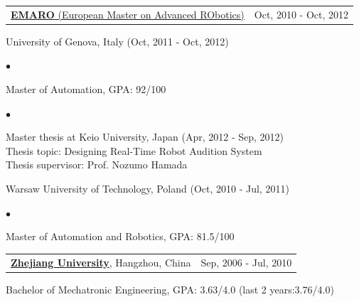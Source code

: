 \documentclass[margin,line]{res}
\newenvironment{list1}{
  \begin{list}{\ding{113}}{%
      \setlength{\itemsep}{0in}
      \setlength{\parsep}{0in} \setlength{\parskip}{0in}
      \setlength{\topsep}{0in} \setlength{\partopsep}{0in} 
      \setlength{\leftmargin}{0.17in}}}{\end{list}}
\newenvironment{list2}{
  \begin{list}{$\bullet$}{%
      \setlength{\itemsep}{0in}
      \setlength{\parsep}{0in} \setlength{\parskip}{0in}
      \setlength{\topsep}{0in} \setlength{\partopsep}{0in} 
      \setlength{\leftmargin}{0.2in}}}{\end{list}}
\begin{document}
\begin{resume}
\begin{tabularx}{\textwidth}{X r}
\href{http://emaro.irccyn.ec-nantes.fr/}{{\bf EMARO} (European Master on Advanced RObotics)} &Oct, 2010 - Oct, 2012\\
\end{tabularx}
\vspace*{-.1in}
\begin{list1}
\item[] University of Genova, Italy (Oct, 2011 - Oct, 2012)
\begin{list2}
\vspace*{.05in}
\item Master of Automation, GPA: 92/100
\end{list2}
\begin{list2}
\vspace*{.05in}
\item Master thesis at Keio University, Japan (Apr, 2012 - Sep, 2012)\\
Thesis topic: Designing Real-Time Robot Audition System\\
Thesis supervisor: Prof. Nozumo Hamada
\end{list2}
\end{list1}
\begin{list1}
\item[] Warsaw University of Technology, Poland (Oct, 2010 - Jul, 2011)
\begin{list2}
\vspace*{.05in}
\item Master of Automation and Robotics, GPA: 81.5/100
\end{list2}
\end{list1}

\begin{tabularx}{\textwidth}{X r}
\href{http://www.zju.edu.cn/english/}{{\bf Zhejiang University}}, Hangzhou, China   &Sep, 2006 - Jul, 2010\\
\end{tabularx}
\vspace*{-.1in}
\begin{list1}
\item[] Bachelor of Mechatronic Engineering, GPA: 3.63/4.0 (last 2 years:3.76/4.0)
\end{list1}







\end{resume}
\end{document}
